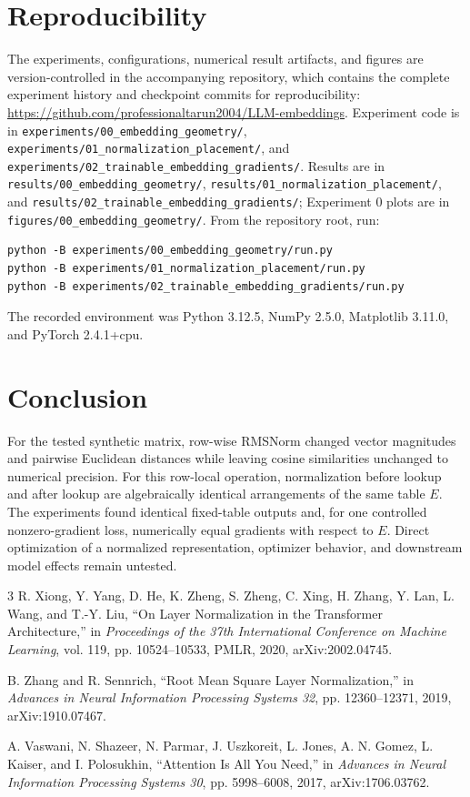 \documentclass[conference]{IEEEtran}
\begin{document}
\section{Reproducibility}
The experiments, configurations, numerical result artifacts, and figures are version-controlled in the accompanying repository, which contains the complete experiment history and checkpoint commits for reproducibility: \url{https://github.com/professionaltarun2004/LLM-embeddings}. Experiment code is in \texttt{experiments/00\_embedding\_geometry/}, \texttt{experiments/01\_normalization\_placement/}, and \texttt{experiments/02\_trainable\_embedding\_gradients/}. Results are in \texttt{results/00\_embedding\_geometry/}, \texttt{results/01\_normalization\_placement/}, and \texttt{results/02\_trainable\_embedding\_gradients/}; Experiment 0 plots are in \texttt{figures/00\_embedding\_geometry/}. From the repository root, run:
\begin{verbatim}
python -B experiments/00_embedding_geometry/run.py
python -B experiments/01_normalization_placement/run.py
python -B experiments/02_trainable_embedding_gradients/run.py
\end{verbatim}
The recorded environment was Python 3.12.5, NumPy 2.5.0, Matplotlib 3.11.0, and PyTorch 2.4.1+cpu.

\section{Conclusion}
For the tested synthetic matrix, row-wise RMSNorm changed vector magnitudes and pairwise Euclidean distances while leaving cosine similarities unchanged to numerical precision. For this row-local operation, normalization before lookup and after lookup are algebraically identical arrangements of the same table \(E\). The experiments found identical fixed-table outputs and, for one controlled nonzero-gradient loss, numerically equal gradients with respect to \(E\). Direct optimization of a normalized representation, optimizer behavior, and downstream model effects remain untested.

\begin{thebibliography}{3}
R. Xiong, Y. Yang, D. He, K. Zheng, S. Zheng, C. Xing, H. Zhang, Y. Lan, L. Wang, and T.-Y. Liu, ``On Layer Normalization in the Transformer Architecture,'' in \emph{Proceedings of the 37th International Conference on Machine Learning}, vol. 119, pp. 10524--10533, PMLR, 2020, arXiv:2002.04745.

B. Zhang and R. Sennrich, ``Root Mean Square Layer Normalization,'' in \emph{Advances in Neural Information Processing Systems 32}, pp. 12360--12371, 2019, arXiv:1910.07467.

A. Vaswani, N. Shazeer, N. Parmar, J. Uszkoreit, L. Jones, A. N. Gomez, L. Kaiser, and I. Polosukhin, ``Attention Is All You Need,'' in \emph{Advances in Neural Information Processing Systems 30}, pp. 5998--6008, 2017, arXiv:1706.03762.
\end{thebibliography}
\end{document}
